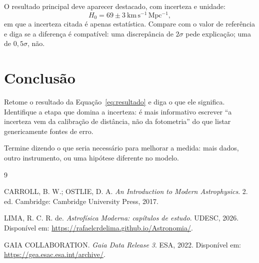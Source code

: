 \documentclass[10pt,a4paper,twocolumn]{article}
\begin{document}
O resultado principal deve aparecer destacado, com incerteza e unidade:
\begin{equation}
    H_0 = 69 \pm 3\ \mathrm{km\,s^{-1}\,Mpc^{-1}},
    \label{eq:resultado}
\end{equation}
em que a incerteza citada é apenas estatística. Compare com o valor de
referência e diga se a diferença é compatível: uma discrepância de
$2\sigma$ pede explicação; uma de $0{,}5\sigma$, não.

\section{Conclusão}
\label{sec:conclusao}

Retome o resultado da Equação~\eqref{eq:resultado} e diga o que ele
significa. Identifique a etapa que domina a incerteza: é mais informativo
escrever ``a incerteza vem da calibração de distância, não da fotometria''
do que listar genericamente fontes de erro.

Termine dizendo o que seria necessário para melhorar a medida: mais dados,
outro instrumento, ou uma hipótese diferente no modelo.

\begin{thebibliography}{9}
\small

CARROLL, B. W.; OSTLIE, D. A.
\textit{An Introduction to Modern Astrophysics}.
2. ed. Cambridge: Cambridge University Press, 2017.

LIMA, R. C. R. de.
\textit{Astrofísica Moderna: capítulos de estudo}.
UDESC, 2026. Disponível em:
\url{https://rafaelcrdelima.github.io/Astronomia/}.

GAIA COLLABORATION.
\textit{Gaia Data Release 3}. ESA, 2022. Disponível em:
\url{https://gea.esac.esa.int/archive/}.

\end{thebibliography}
\end{document}
